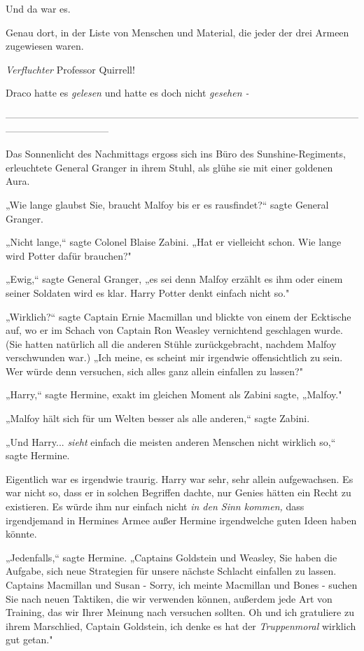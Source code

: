 {Und da war es.

Genau dort, in der Liste von Menschen und Material, die jeder der drei Armeen zugewiesen waren.

\emph{Verfluchter} Professor Quirrell!

Draco hatte es \emph{gelesen} und hatte es doch nicht \emph{gesehen -}

--------------------------------------------------------------------------------------------------------------------------------------------

\hfill\break Das Sonnenlicht des Nachmittags ergoss sich ins Büro des Sunshine-Regiments, erleuchtete General Granger in ihrem Stuhl, als glühe sie mit einer goldenen Aura.

„Wie lange glaubst Sie, braucht Malfoy bis er es rausfindet?“ sagte General Granger.

„Nicht lange,“ sagte Colonel Blaise Zabini. „Hat er vielleicht schon. Wie lange wird Potter dafür brauchen?"

„Ewig,“ sagte General Granger, „es sei denn Malfoy erzählt es ihm oder einem seiner Soldaten wird es klar. Harry Potter denkt einfach nicht so."

„Wirklich?“ sagte Captain Ernie Macmillan und blickte von einem der Ecktische auf, wo er im Schach von Captain Ron Weasley vernichtend geschlagen wurde. (Sie hatten natürlich all die anderen Stühle zurückgebracht, nachdem Malfoy verschwunden war.) „Ich meine, es scheint mir irgendwie offensichtlich zu sein. Wer würde denn versuchen, sich alles ganz allein einfallen zu lassen?"

„Harry,“ sagte Hermine, exakt im gleichen Moment als Zabini sagte, „Malfoy."

„Malfoy hält sich für um Welten besser als alle anderen,“ sagte Zabini.

„Und Harry... \emph{sieht} einfach die meisten anderen Menschen nicht wirklich so,“ sagte Hermine.

Eigentlich war es irgendwie traurig. Harry war sehr, sehr allein aufgewachsen. Es war nicht so, dass er in solchen Begriffen dachte, nur Genies hätten ein Recht zu existieren. Es würde ihm nur einfach nicht \emph{in den Sinn kommen,} dass irgendjemand in Hermines Armee außer Hermine irgendwelche guten Ideen haben könnte.

„Jedenfalls,“ sagte Hermine. „Captains Goldstein und Weasley, Sie haben die Aufgabe, sich neue Strategien für unsere nächste Schlacht einfallen zu lassen. Captains Macmillan und Susan - Sorry, ich meinte Macmillan und Bones - suchen Sie nach neuen Taktiken, die wir verwenden können, außerdem jede Art von Training, das wir Ihrer Meinung nach versuchen sollten. Oh und ich gratuliere zu ihrem Marschlied, Captain Goldstein, ich denke es hat der \emph{Truppenmoral} wirklich gut getan."

}
